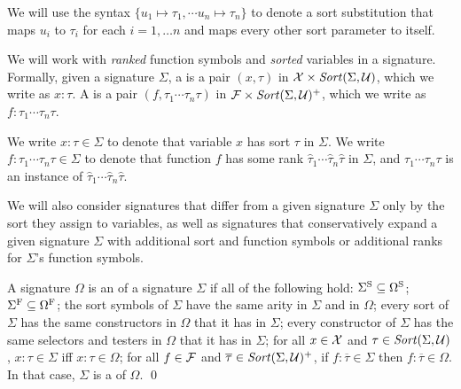 We will use the syntax $\{u_1 \mapsto \tau_1, \cdots u_n \mapsto \tau_n \}$
to denote a sort substitution that maps $u_i$ to $\tau_i$ for each $i=1,\dots n$
and maps every other sort parameter to itself.

We will work with \emph{ranked} function symbols and \emph{sorted} variables
in a signature.
Formally,
given a signature $\Sigma$,
a  is 
a pair $(x,\tau)$ in $\mathcal{X} \times \mathit{Sort}(\Sigma, \mathcal{U})$,
which we write as $x{:}\tau$.
A  is 
a pair $(f, \tau_1\cdots\tau_n\tau)$ in $\mathcal{F} \times \mathit{Sort}(\Sigma, \mathcal{U})^+$,
which we write as $f{:}\tau_1\cdots\tau_n\tau$.

\begin{notation}
We write $x{:}\tau \in \Sigma$
to denote that variable $x$ has sort $\tau$ in $\Sigma$.
We write  $f{:}\tau_1\cdots\tau_n\tau \in \Sigma$
to denote that function $f$ has some rank $\hat\tau_1\cdots\hat\tau_n\hat\tau$ in $\Sigma$, and
$\tau_1\cdots\tau_n\tau$ is an instance of $\hat\tau_1\cdots\hat\tau_n\hat\tau$.
\end{notation}

We will also consider signatures that differ from a given signature $\Sigma$
only by the sort they assign to variables,
as well as signatures that conservatively expand a given signature $\Sigma$
with additional sort and function symbols or additional ranks 
for $\Sigma$'s function symbols.

\begin{definition}[Signature expansions] 

A signature $\Omega$ is an  of a signature $\Sigma$
if all of the following hold:
$\Sigma^\mathrm{S} \subseteq \Omega^\mathrm{S}$;
$\Sigma^\mathrm{F} \subseteq \Omega^\mathrm{F}$;
the sort symbols of $\Sigma$ have the same arity in $\Sigma$ and in $\Omega$;
every sort of $\Sigma$ has the same constructors in $\Omega$ that it has in $\Sigma$;
every constructor of $\Sigma$ has the same selectors and testers in $\Omega$ 
that it has in $\Sigma$;
for all $x \in \mathcal{X}$ and $\tau \in \mathit{Sort}(\Sigma, \mathcal{U})$,
$x{:}\tau \in \Sigma$ iff $x{:}\tau \in \Omega$;
for all $f \in \mathcal{F}$ and $\overline{\tau} \in \mathit{Sort}(\Sigma, \mathcal{U})^+$,
if $f{:}\overline{\tau} \in \Sigma$ then $f{:}\overline{\tau} \in \Omega$.
In that case, $\Sigma$ is a  of $\Omega$.
\qed
\end{definition}


